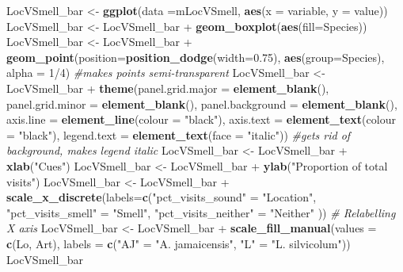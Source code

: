\documentclass[]{article}
\newenvironment{Shaded}{\begin{snugshade}}{\end{snugshade}}
\newcommand{\KeywordTok}[1]{\textcolor[rgb]{0.13,0.29,0.53}{\textbf{{#1}}}}
\newcommand{\DataTypeTok}[1]{\textcolor[rgb]{0.13,0.29,0.53}{{#1}}}
\newcommand{\DecValTok}[1]{\textcolor[rgb]{0.00,0.00,0.81}{{#1}}}
\newcommand{\FloatTok}[1]{\textcolor[rgb]{0.00,0.00,0.81}{{#1}}}
\newcommand{\StringTok}[1]{\textcolor[rgb]{0.31,0.60,0.02}{{#1}}}
\newcommand{\CommentTok}[1]{\textcolor[rgb]{0.56,0.35,0.01}{\textit{{#1}}}}
\newcommand{\NormalTok}[1]{{#1}}
\begin{document}
\begin{Shaded}
\begin{Highlighting}[]
\NormalTok{LocVSmell_bar <-}\StringTok{ }\KeywordTok{ggplot}\NormalTok{(}\DataTypeTok{data =}\NormalTok{mLocVSmell, }\KeywordTok{aes}\NormalTok{(}\DataTypeTok{x =} \NormalTok{variable, }\DataTypeTok{y =} \NormalTok{value))}
\NormalTok{LocVSmell_bar <-}\StringTok{ }\NormalTok{LocVSmell_bar +}\StringTok{ }\KeywordTok{geom_boxplot}\NormalTok{(}\KeywordTok{aes}\NormalTok{(}\DataTypeTok{fill=}\NormalTok{Species))}
\NormalTok{LocVSmell_bar <-}\StringTok{ }\NormalTok{LocVSmell_bar +}\StringTok{ }\KeywordTok{geom_point}\NormalTok{(}\DataTypeTok{position=}\KeywordTok{position_dodge}\NormalTok{(}\DataTypeTok{width=}\FloatTok{0.75}\NormalTok{), }\KeywordTok{aes}\NormalTok{(}\DataTypeTok{group=}\NormalTok{Species), }\DataTypeTok{alpha =} \DecValTok{1}\NormalTok{/}\DecValTok{4}\NormalTok{) }\CommentTok{#makes points semi-transparent}
\NormalTok{LocVSmell_bar <-}\StringTok{ }\NormalTok{LocVSmell_bar +}\StringTok{ }\KeywordTok{theme}\NormalTok{(}\DataTypeTok{panel.grid.major =} \KeywordTok{element_blank}\NormalTok{(), }\DataTypeTok{panel.grid.minor =} \KeywordTok{element_blank}\NormalTok{(),}
\DataTypeTok{panel.background =} \KeywordTok{element_blank}\NormalTok{(), }\DataTypeTok{axis.line =} \KeywordTok{element_line}\NormalTok{(}\DataTypeTok{colour =} \StringTok{"black"}\NormalTok{), }\DataTypeTok{axis.text =} \KeywordTok{element_text}\NormalTok{(}\DataTypeTok{colour =} \StringTok{"black"}\NormalTok{), }\DataTypeTok{legend.text =} \KeywordTok{element_text}\NormalTok{(}\DataTypeTok{face =} \StringTok{"italic"}\NormalTok{))  }\CommentTok{#gets rid of background, makes legend italic}
\NormalTok{LocVSmell_bar <-}\StringTok{ }\NormalTok{LocVSmell_bar +}\StringTok{ }\KeywordTok{xlab}\NormalTok{(}\StringTok{"Cues"}\NormalTok{)}
\NormalTok{LocVSmell_bar <-}\StringTok{ }\NormalTok{LocVSmell_bar +}\StringTok{ }\KeywordTok{ylab}\NormalTok{(}\StringTok{"Proportion of total visits"}\NormalTok{)}
\NormalTok{LocVSmell_bar <-}\StringTok{ }\NormalTok{LocVSmell_bar +}\StringTok{ }\KeywordTok{scale_x_discrete}\NormalTok{(}\DataTypeTok{labels=}\KeywordTok{c}\NormalTok{(}\StringTok{"pct_visits_sound"} \NormalTok{=}\StringTok{ "Location"}\NormalTok{, }\StringTok{"pct_visits_smell"} \NormalTok{=}\StringTok{ "Smell"}\NormalTok{,}
                              \StringTok{"pct_visits_neither"} \NormalTok{=}\StringTok{ "Neither"} \NormalTok{))  }\CommentTok{# Relabelling X axis}
\NormalTok{LocVSmell_bar <-}\StringTok{ }\NormalTok{LocVSmell_bar +}\StringTok{  }\KeywordTok{scale_fill_manual}\NormalTok{(}\DataTypeTok{values =} \KeywordTok{c}\NormalTok{(Lo, Art), }\DataTypeTok{labels =} \KeywordTok{c}\NormalTok{(}\StringTok{"AJ"} \NormalTok{=}\StringTok{ "A. jamaicensis"}\NormalTok{, }\StringTok{"L"} \NormalTok{=}\StringTok{ "L. silvicolum"}\NormalTok{))}
\NormalTok{LocVSmell_bar}
\end{Highlighting}
\end{Shaded}
\end{document}
